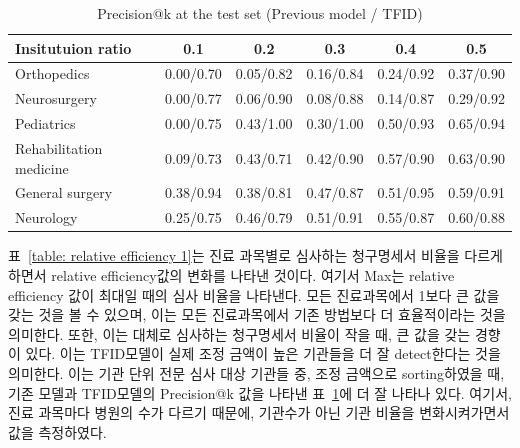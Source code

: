 \documentclass[11pt]{article}           %
\begin{document}
\begin{table}[]
    \centering
    \caption{Precision@k at the test set (Previous model / TFID)}
    \vspace{0.5cm}
    \label{table: precision@k 1}
    \begin{tabular}{@{}lccccc@{}}
    \toprule
    Insitutuion ratio       & 0.1       & 0.2       & 0.3       & 0.4       & 0.5       \\ \midrule
    Orthopedics             & 0.00/0.70 & 0.05/0.82 & 0.16/0.84 & 0.24/0.92 & 0.37/0.90 \\
    Neurosurgery            & 0.00/0.77 & 0.06/0.90 & 0.08/0.88 & 0.14/0.87 & 0.29/0.92 \\
    Pediatrics              & 0.00/0.75 & 0.43/1.00 & 0.30/1.00 & 0.50/0.93 & 0.65/0.94 \\
    Rehabilitation medicine & 0.09/0.73 & 0.43/0.71 & 0.42/0.90 & 0.57/0.90 & 0.63/0.90 \\
    General surgery         & 0.38/0.94 & 0.38/0.81 & 0.47/0.87 & 0.51/0.95 & 0.59/0.91 \\
    Neurology               & 0.25/0.75 & 0.46/0.79 & 0.51/0.91 & 0.55/0.87 & 0.60/0.88 \\ \bottomrule
    \end{tabular}
\end{table}


표~\ref{table: relative efficiency 1}는 진료 과목별로 심사하는 청구명세서 비율을 다르게 하면서 relative efficiency값의 변화를 나타낸 것이다.
여기서 Max는 relative efficiency 값이 최대일 때의 심사 비율을 나타낸다.
모든 진료과목에서 1보다 큰 값을 갖는 것을 볼 수 있으며, 이는 모든 진료과목에서 기존 방법보다 더 효율적이라는 것을 의미한다.
또한, 이는 대체로 심사하는 청구명세서 비율이 작을 때, 큰 값을 갖는 경향이 있다.
이는 TFID모델이 실제 조정 금액이 높은 기관들을 더 잘 detect한다는 것을 의미한다.
이는 기관 단위 전문 심사  대상 기관들 중, 조정 금액으로 sorting하였을 때, 기존 모델과 TFID모델의 Precision@k 값을 나타낸 표~\ref{table: precision@k 1}에 더 잘 나타나 있다.
여기서, 진료 과목마다 병원의 수가 다르기 때문에, 기관수가 아닌 기관 비율을 변화시켜가면서 값을 측정하였다.
\end{document}
